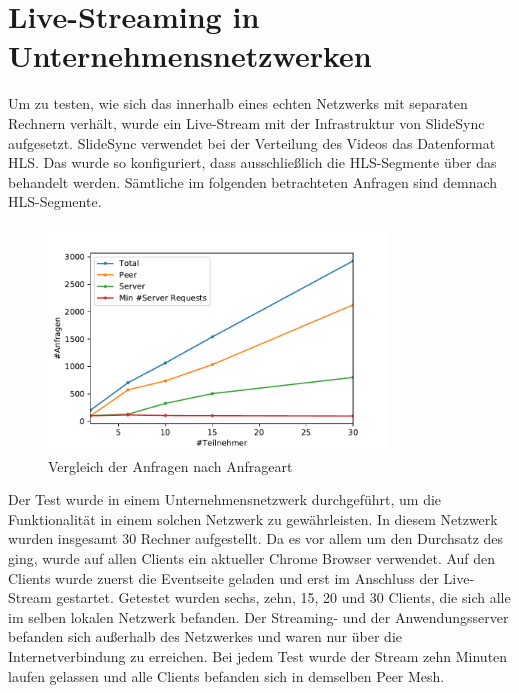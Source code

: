 \section{Live-Streaming in Unternehmensnetzwerken}\label{e:realNetwork}
Um zu testen, wie sich das \cdn innerhalb eines echten Netzwerks mit separaten Rechnern verhält, wurde ein Live-Stream mit der Infrastruktur von SlideSync aufgesetzt. SlideSync verwendet bei der Verteilung des Videos das Datenformat HLS. Das \cdn wurde so konfiguriert, dass ausschließlich die HLS-Segmente über das \cdn behandelt werden. Sämtliche im folgenden betrachteten Anfragen sind demnach HLS-Segmente. 
\begin{figure}[!h]
	\centering
	\includegraphics[width=0.8\textwidth]{figures/clients_line_chart}
	\caption[Vergleich der Anfragen nach Anfrageart]{Vergleich der Anfragen nach Anfrageart}
	\label{fig:live_stream_line_chart}
\end{figure}
Der Test wurde in einem Unternehmensnetzwerk durchgeführt, um die Funktionalität in einem solchen Netzwerk zu gewährleisten. In diesem Netzwerk wurden insgesamt 30 Rechner aufgestellt. Da es vor allem um den Durchsatz des \cdns ging, wurde auf allen Clients ein aktueller Chrome Browser verwendet. Auf den Clients wurde zuerst die Eventseite geladen und erst im Anschluss der Live-Stream gestartet. Getestet wurden sechs, zehn, 15, 20 und 30 Clients, die sich alle im selben lokalen Netzwerk befanden. Der Streaming- und der Anwendungsserver befanden sich außerhalb des Netzwerkes und waren nur über die Internetverbindung zu erreichen. Bei jedem Test wurde der Stream zehn Minuten laufen gelassen und alle Clients befanden sich in demselben Peer Mesh.

